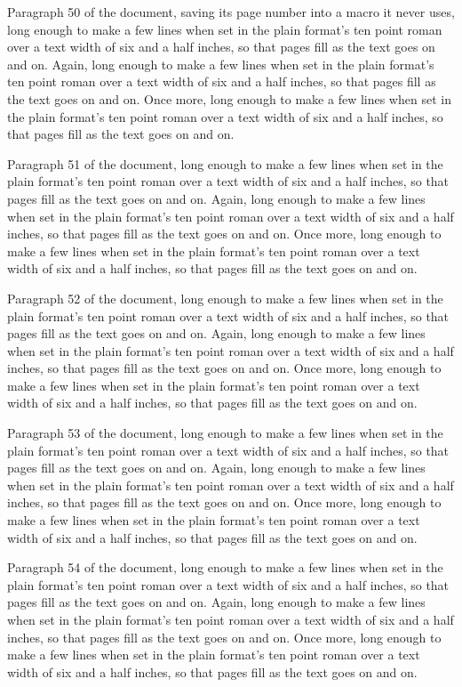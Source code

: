 Paragraph 50 of the document, \edef\thisbox{\number\count0}saving its page number into a macro it never uses, long enough to make a few lines when set in the plain format's ten point roman over a text width of six and a half inches, so that pages fill as the text goes on and on. Again, long enough to make a few lines when set in the plain format's ten point roman over a text width of six and a half inches, so that pages fill as the text goes on and on. Once more, long enough to make a few lines when set in the plain format's ten point roman over a text width of six and a half inches, so that pages fill as the text goes on and on.

Paragraph 51 of the document, long enough to make a few lines when set in the plain format's ten point roman over a text width of six and a half inches, so that pages fill as the text goes on and on. Again, long enough to make a few lines when set in the plain format's ten point roman over a text width of six and a half inches, so that pages fill as the text goes on and on. Once more, long enough to make a few lines when set in the plain format's ten point roman over a text width of six and a half inches, so that pages fill as the text goes on and on.

Paragraph 52 of the document, long enough to make a few lines when set in the plain format's ten point roman over a text width of six and a half inches, so that pages fill as the text goes on and on. Again, long enough to make a few lines when set in the plain format's ten point roman over a text width of six and a half inches, so that pages fill as the text goes on and on. Once more, long enough to make a few lines when set in the plain format's ten point roman over a text width of six and a half inches, so that pages fill as the text goes on and on.

Paragraph 53 of the document, long enough to make a few lines when set in the plain format's ten point roman over a text width of six and a half inches, so that pages fill as the text goes on and on. Again, long enough to make a few lines when set in the plain format's ten point roman over a text width of six and a half inches, so that pages fill as the text goes on and on. Once more, long enough to make a few lines when set in the plain format's ten point roman over a text width of six and a half inches, so that pages fill as the text goes on and on.

Paragraph 54 of the document, long enough to make a few lines when set in the plain format's ten point roman over a text width of six and a half inches, so that pages fill as the text goes on and on. Again, long enough to make a few lines when set in the plain format's ten point roman over a text width of six and a half inches, so that pages fill as the text goes on and on. Once more, long enough to make a few lines when set in the plain format's ten point roman over a text width of six and a half inches, so that pages fill as the text goes on and on.

